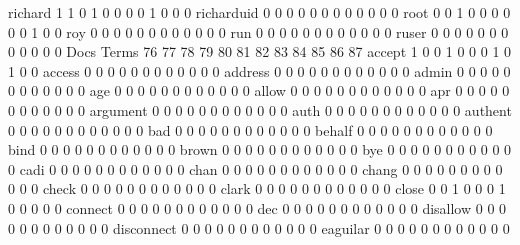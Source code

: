 \documentclass[compress,8pt]{beamer}
\begin{document}
\begin{frame}
\begin{Schunk}
  richard                                   1  1  0  1  0  0  0  0  1  0  0  0
  richarduid                                0  0  0  0  0  0  0  0  0  0  0  0
  root                                      0  0  1  0  0  0  0  0  0  1  0  0
  roy                                       0  0  0  0  0  0  0  0  0  0  0  0
  run                                       0  0  0  0  0  0  0  0  0  0  0  0
  ruser                                     0  0  0  0  0  0  0  0  0  0  0  0
                                          Docs
Terms                                      76 77 78 79 80 81 82 83 84 85 86 87
  accept                                    1  0  0  1  0  0  0  1  0  1  0  0
  access                                    0  0  0  0  0  0  0  0  0  0  0  0
  address                                   0  0  0  0  0  0  0  0  0  0  0  0
  admin                                     0  0  0  0  0  0  0  0  0  0  0  0
  age                                       0  0  0  0  0  0  0  0  0  0  0  0
  allow                                     0  0  0  0  0  0  0  0  0  0  0  0
  apr                                       0  0  0  0  0  0  0  0  0  0  0  0
  argument                                  0  0  0  0  0  0  0  0  0  0  0  0
  auth                                      0  0  0  0  0  0  0  0  0  0  0  0
  authent                                   0  0  0  0  0  0  0  0  0  0  0  0
  bad                                       0  0  0  0  0  0  0  0  0  0  0  0
  behalf                                    0  0  0  0  0  0  0  0  0  0  0  0
  bind                                      0  0  0  0  0  0  0  0  0  0  0  0
  brown                                     0  0  0  0  0  0  0  0  0  0  0  0
  bye                                       0  0  0  0  0  0  0  0  0  0  0  0
  cadi                                      0  0  0  0  0  0  0  0  0  0  0  0
  chan                                      0  0  0  0  0  0  0  0  0  0  0  0
  chang                                     0  0  0  0  0  0  0  0  0  0  0  0
  check                                     0  0  0  0  0  0  0  0  0  0  0  0
  clark                                     0  0  0  0  0  0  0  0  0  0  0  0
  close                                     0  0  1  0  0  0  1  0  0  0  0  0
  connect                                   0  0  0  0  0  0  0  0  0  0  0  0
  dec                                       0  0  0  0  0  0  0  0  0  0  0  0
  disallow                                  0  0  0  0  0  0  0  0  0  0  0  0
  disconnect                                0  0  0  0  0  0  0  0  0  0  0  0
  eaguilar                                  0  0  0  0  0  0  0  0  0  0  0  0

\end{Schunk}
\end{frame}
\end{document}
